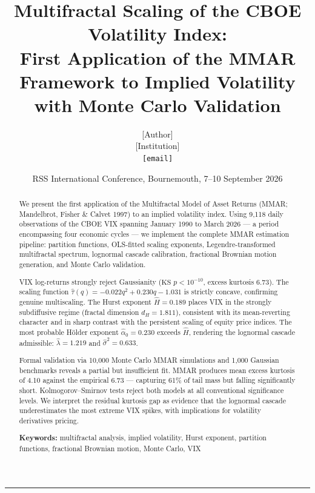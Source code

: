 \documentclass[12pt,a4paper]{article}
\title{\textbf{Multifractal Scaling of the CBOE Volatility Index:\\
First Application of the MMAR Framework to Implied Volatility\\
with Monte Carlo Validation}}
\author{[Author]\\
\small [Institution]\\
\small \texttt{[email]}}
\date{RSS International Conference, Bournemouth, 7--10 September 2026}
\begin{document}
\maketitle

\begin{abstract}
We present the first application of the Multifractal Model of Asset
Returns (MMAR; Mandelbrot, Fisher \& Calvet 1997) to an implied
volatility index. Using 9,118 daily observations of the CBOE VIX
spanning January 1990 to March 2026 --- a period encompassing four
economic cycles --- we implement the complete MMAR estimation pipeline:
partition functions, OLS-fitted scaling exponents, Legendre-transformed
multifractal spectrum, lognormal cascade calibration, fractional
Brownian motion generation, and Monte Carlo validation.

VIX log-returns strongly reject Gaussianity ($\text{KS } p < 10^{-10}$,
excess kurtosis 6.73). The scaling function
$\hat{\tau}(q) = -0.022q^2 + 0.230q - 1.031$ is strictly concave,
confirming genuine multiscaling. The Hurst exponent $\hat{H} = 0.189$
places VIX in the strongly subdiffusive regime (fractal dimension
$d_H = 1.811$), consistent with its mean-reverting character and in
sharp contrast with the persistent scaling of equity price indices.
The most probable H\"{o}lder exponent $\hat{\alpha}_0 = 0.230$
exceeds $\hat{H}$, rendering the lognormal cascade admissible:
$\hat{\lambda} = 1.219$ and $\hat{\sigma}^2 = 0.633$.

Formal validation via 10,000 Monte Carlo MMAR simulations and 1,000
Gaussian benchmarks reveals a partial but insufficient fit. MMAR
produces mean excess kurtosis of 4.10 against the empirical 6.73 ---
capturing 61\% of tail mass but falling significantly short.
Kolmogorov--Smirnov tests reject both models at all conventional
significance levels. We interpret the residual kurtosis gap as
evidence that the lognormal cascade underestimates the most extreme
VIX spikes, with implications for volatility derivatives pricing.

\noindent\textbf{Keywords:} multifractal analysis, implied volatility,
Hurst exponent, partition functions, fractional Brownian motion,
Monte Carlo, VIX
\end{abstract}

\bigskip
\hrule
\bigskip

\end{document}
